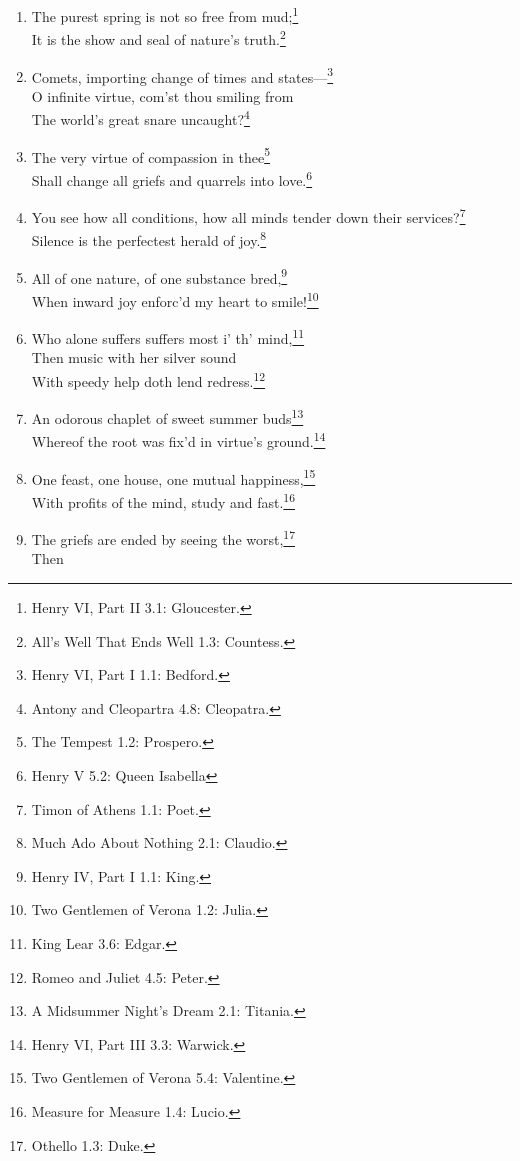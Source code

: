 \documentclass[17pt,twoside]{extarticle}
\begin{document}
\begin{enumerate}
  To make you understand this in a manifested effect:\footnote{Measure
    For Measure 4.2: Duke.}\\Now you are heir, therefore enjoy it
  now.\footnote{Henry VI, Part III 1.2: Edward.}
\item
  The purest spring is not so free from mud;\footnote{Henry VI, Part II
    3.1: Gloucester.}\\It is the show and seal of nature's
  truth.\footnote{All's Well That Ends Well 1.3: Countess.}
\item
  Comets, importing change of times and states---\footnote{Henry VI,
    Part I 1.1: Bedford.}\\O infinite virtue, com'st thou smiling
  from\\The world's great snare uncaught?\footnote{Antony and Cleopartra
    4.8: Cleopatra.}
\item
  The very virtue of compassion in thee\footnote{The Tempest 1.2:
    Prospero.}\\Shall change all griefs and quarrels into
  love.\footnote{Henry V 5.2: Queen Isabella}
\item
  You see how all conditions, how all minds tender down their
  services?\footnote{Timon of Athens 1.1: Poet.}\\Silence is the
  perfectest herald of joy.\footnote{Much Ado About Nothing 2.1:
    Claudio.}
\item
  All of one nature, of one substance bred,\footnote{Henry IV, Part I
    1.1: King.}\\When inward joy enforc'd my heart to smile!\footnote{Two
    Gentlemen of Verona 1.2: Julia.}
\item
  Who alone suffers suffers most i' th' mind,\footnote{King Lear 3.6:
    Edgar.}\\Then music with her silver sound\\With speedy help doth
  lend redress.\footnote{Romeo and Juliet 4.5: Peter.}
\item
  An odorous chaplet of sweet summer buds\footnote{A Midsummer Night's
    Dream 2.1: Titania.}\\Whereof the root was fix'd in virtue's
  ground.\footnote{Henry VI, Part III 3.3: Warwick.}
\item
  One feast, one house, one mutual happiness,\footnote{Two Gentlemen of
    Verona 5.4: Valentine.}\\With profits of the mind, study and
  fast.\footnote{Measure for Measure 1.4: Lucio.}
\item
  The griefs are ended by seeing the worst,\footnote{Othello 1.3: Duke.}\\Then

\end{enumerate}
\end{document}
